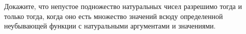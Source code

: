 Докажите, что непустое подножество натуральных чисел разрешимо тогда и только тогда, когда оно есть множество значений всюду
определенной неубывающей функции с натуральными аргументами и значениями.